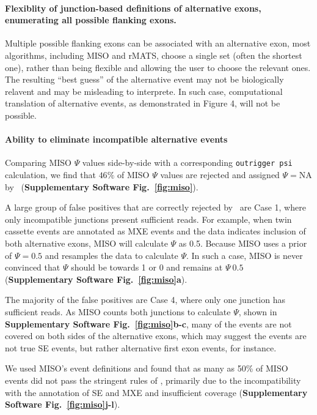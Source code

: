 \paragraph{Flexiblity of junction-based definitions of alternative exons, enumerating all possible flanking exons.} Multiple possible flanking exons can be associated with an alternative exon, most algorithms, including MISO and rMATS\cite{Shen:2014gs}, choose a single set (often the shortest one), rather than being flexible and allowing the user to choose the relevant ones. The resulting ``best guess'' of the alternative event may not be biologically relavent and may be misleading to interprete. In such case, computational translation of alternative events, as demonstrated in Figure 4, will not be possible. 

\paragraph{Ability to eliminate incompatible alternative events} Comparing MISO $\Psi$ values side-by-side with a corresponding \texttt{outrigger psi} calculation, we find that $46\%$ of MISO $\Psi$ values are rejected and assigned $\Psi = \text{NA}$ by \outrigger\, (\textbf{Supplementary Software Fig.~\ref{fig:miso}}). 

A large group of false positives that are correctly rejected by \outrigger\, are Case 1, where only incompatible junctions present sufficient reads. For example, when twin cassette events are annotated as MXE events and the data indicates inclusion of both alternative exons, MISO will calculate $\Psi$ as 0.5. Because MISO uses a prior of $\Psi=0.5$ and resamples the data to calculate $\Psi$. In such a case, MISO is never convinced that $\Psi$ should be towards 1 or 0 and remains at $\Psi~0.5$ (\textbf{Supplementary Software Fig.~\ref{fig:miso}a}). %


The majority of the false positives are Case 4, where only one junction has sufficient reads. As MISO counts both junctions to calculate $\Psi$, shown in \textbf{Supplementary Software Fig.~\ref{fig:miso}b-c}, many of the events are not covered on both sides of the alternative exons, which may suggest the events are not true SE events, but rather alternative first exon events, for instance. 

We used MISO's event definitions and found that as many as 50\% of MISO events did not pass the stringent rules of \outrigger, primarily due to the incompatibility with the annotation of SE and MXE and insufficient coverage (\textbf{Supplementary Software Fig.~\ref{fig:miso}j-l}). 


